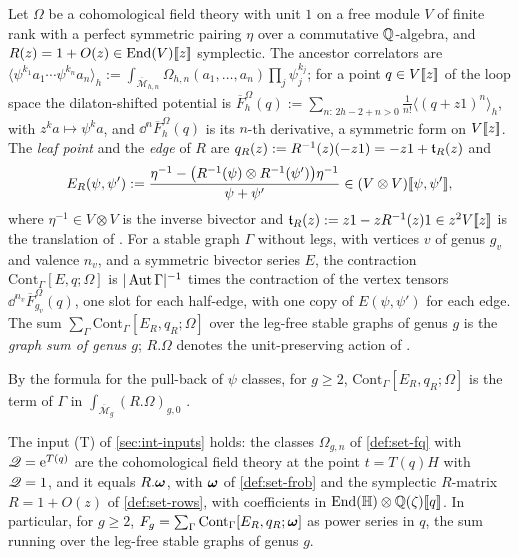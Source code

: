\begin{defn}
\label{def:set-graphsum}
Let $\Omega$ be a cohomological field theory with unit $1$ \cite[Def.~0.3]{PPZ15} on a free module $V$ of finite rank with a perfect symmetric pairing $\eta$ over a commutative $\mathbb{Q}$-algebra, and $R(z)=1+O(z)\in\operatorname{End}(V)[\![ z ]\!]$ symplectic. The ancestor correlators are $\langle\psi^{k_1}a_1\cdots\psi^{k_n}a_n\rangle_h:=\int_{\overline{\mathcal M}_{h,n}}\Omega_{h,n}(a_1,\dots,a_n)\prod_j\psi_j^{k_j}$; for a point $q\in V[\![ z ]\!]$ of the loop space the dilaton-shifted potential is $\overline F^\Omega_h(q):=\sum_{n:\,2h-2+n>0}\frac1{n!}\langle(q+z1)^n\rangle_h$, with $z^ka\mapsto\psi^ka$, and $\dd^n\overline F^\Omega_h(q)$ is its $n$-th derivative, a symmetric form on $V[\![ z ]\!]$. The \emph{leaf point} and the \emph{edge} of $R$ are $q_R(z):=R^{-1}(z)(-z1)=-z1+\mathfrak{t}_R(z)$ and
\[
E_R(\psi,\psi'):=\frac{\eta^{-1}-\bigl(R^{-1}(\psi)\otimes R^{-1}(\psi')\bigr)\eta^{-1}}{\psi+\psi'}\in(V\otimes V)[\![ \psi,\psi' ]\!],
\]
where $\eta^{-1}\in V\otimes V$ is the inverse bivector and $\mathfrak{t}_R(z):=z1-zR^{-1}(z)1\in z^2V[\![ z ]\!]$ is the translation of \cite[Def.~2.13]{PPZ15}. For a stable graph $\Gamma$ without legs, with vertices $v$ of genus $g_v$ and valence $n_v$, and a symmetric bivector series $E$, the contraction $\mathrm{Cont}_\Gamma[E,q;\Omega]$ is $|\operatorname{Aut}\Gamma|^{-1}$ times the contraction of the vertex tensors $\dd^{n_v}\overline F^\Omega_{g_v}(q)$, one slot for each half-edge, with one copy of $E(\psi,\psi')$ for each edge. The sum $\sum_\Gamma\mathrm{Cont}_\Gamma[E_R,q_R;\Omega]$ over the leg-free stable graphs of genus $g$ is the \emph{graph sum of genus $g$}; $R.\Omega$ denotes the unit-preserving action of \cite[Defs.~2.2, 2.5, 2.13]{PPZ15}.
\end{defn}

By the formula \cite[(8)]{PPZ15} for the pull-back of $\psi$ classes, for $g\geq2$, $\mathrm{Cont}_\Gamma[E_R,q_R;\Omega]$ is the term of $\Gamma$ in $\int_{\overline{\mathcal M}_g}(R.\Omega)_{g,0}$ .

\begin{thm}
\label{thm:set-GT}
The input (T) of \cref{sec:int-inputs} holds: the classes $\Omega_{g,n}$ of \cref{def:set-fq} with $\mathscr{Q}=\mathrm{e}^{T(q)}$ are the cohomological field theory at the point $t=T(q)H$ with $\mathscr{Q}=1$, and it equals $R.\boldsymbol{\omega}$, with $\boldsymbol{\omega}$ of \cref{def:set-frob} and the symplectic $R$-matrix $R=1+O(z)$ of \cref{def:set-rows}, with coefficients in $\operatorname{End}(\mathbb{H})\otimes\mathbb{Q}(\zeta)[\![ q ]\!]$.
In particular, for $g\geq2$, $F_g=\sum_\Gamma\mathrm{Cont}_\Gamma[E_R,q_R;\boldsymbol{\omega}]$ as power series in $q$, the sum running over the leg-free stable graphs of genus $g$.
\end{thm}


